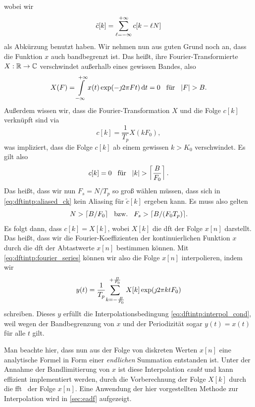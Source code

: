 wobei wir 
\begin{equation}\label{eq:dftintp:aliased_ck}
    \tilde{c}[k] = {\sum\limits_{\ell=-\infty}^{+\infty}{
        c[k - \ell N]
    }}
\end{equation}
als Abkürzung benutzt haben. 
Wir nehmen nun aus guten Grund noch an, dass die Funktion $x$ auch bandbegrenzt ist.
Das heißt, ihre Fourier-Transformierte $X : \mathbb{R} \rightarrow \mathbb{C}$ verschwindet außerhalb eines gewissen Bandes, also
\begin{equation}
    X(F) = {\int\limits_{-\infty}^{+\infty}{x(t) \exp(-\jmath 2 \pi F t )}\,\mathrm{d}{t}} = 0 {\hspace{3mm} \text{für} \hspace{3mm}} {\left| F \right|} > B.
\end{equation}
Außerdem wissen wir, dass die Fourier-Transformation $X$ und die Folge $c[k]$ verknüpft sind via 
\begin{equation}
    c[k] = \frac{1}{T_p} X(k F_0),
\end{equation}
was impliziert, dass die Folge $c[k]$ ab einem gewissen $k > K_0$ verschwindet.
Es gilt also
\begin{equation}
    c[k] = 0 {\hspace{3mm} \text{für} \hspace{3mm}} {\left| k \right|} > \left\lceil \frac{B}{F_0} \right\rceil.
\end{equation}
Das heißt, dass wir nun $F_s = N/T_p$ so groß wählen müssen, dass sich in \eqref{eq:dftintp:aliased_ck} kein Aliasing für $\tilde{c}[k]$ ergeben kann.
Es muss also gelten
\begin{equation}
    N > \lceil B/F_0 \rceil {\hspace{3mm} \text{bzw.} \hspace{3mm}} F_s > \lceil B/(F_0 T_p) \rceil.
\end{equation}
Es folgt dann, dass $c[k] = X[k]$, wobei $X[k]$ die \gls{dft} der Folge $x[n]$ darstellt. 
Das heißt, dass wir die Fourier-Koeffizienten der kontinuierlichen Funktion $x$ durch die \gls{dft} der Abtastwerte $x[n]$ bestimmen können. 
Mit \eqref{eq:dftintp:fourier_series} können wir also die Folge $x[n]$ interpolieren, indem wir
\begin{equation}\label{eq:dftintp:dft_interpolation}
    y(t) = \frac{1}{T_p}{\sum\limits_{k=-\frac{B}{F_0}}^{+\frac{B}{F_0}}{
        X[k] \exp(\jmath 2 \pi k t F_0) 
    }}
\end{equation}
schreiben. 
Dieses $y$ erfüllt die Interpolationsbedingung \eqref{eq:dftintp:interpol_cond}, weil wegen der Bandbegrenzung von $x$ und der Periodizität sogar $y(t) = x(t)$ für alle $t$ gilt.

Man beachte hier, dass nun aus der Folge von diskreten Werten $x[n]$ eine analytische Formel in Form einer \emph{endlichen} Summation entstanden ist. 
Unter der Annahme der Bandlimitierung von $x$ ist diese Interpolation \emph{exakt} und kann effizient implementiert werden, durch die Vorberechnung der Folge $X[k]$ durch die \gls{fft}~\cite{FFTW05} der Folge $x[n]$. 
Eine Anwendung der hier vorgestellten Methode zur Interpolation wird in \cref{sec:eadf} aufgezeigt.
%
%
%
%
\FloatBarrier

